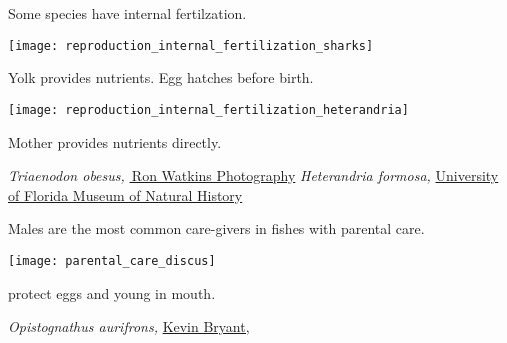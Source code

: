 \label{key}\documentclass[t]{beamer}
\begin{document}
\begin{frame}[t]{Some species have internal fertilzation.}

\vspace*{-\baselineskip}

\begin{multicols}{2}

\texttt{[image: reproduction\_internal\_fertilization\_sharks]}

 Yolk provides nutrients. Egg hatches before birth.

\columnbreak

\texttt{[image: reproduction\_internal\_fertilization\_heterandria]}

 Mother provides nutrients directly.

\end{multicols}

\vfilll

\tiny \textit{Triaenodon obesus, }\href{https://www.ronwatkinsphotography.com/}{\textcopyright\,Ron Watkins Photography} \hfill \textit{Heterandria formosa,} \href{https://www.floridamuseum.ufl.edu/discover-fish/florida-fishes-gallery/least-killifish/}{University of Florida Museum of Natural History}

\end{frame}

%

\begin{frame}[t]{Males are the most common care-givers in fishes with parental care.}

\vspace*{-1.5\baselineskip}

\hfill\texttt{[image: parental\_care\_discus]}


\end{frame}

{
\begin{frame}[t]{ protect eggs and young in mouth.}

\vfilll

\tiny \textit{Opistognathus aurifrons,} \href{https://www.flickr.com/photos/mentalblock/8472805513/in/photostream/}{Kevin Bryant, }
\end{frame}
}
\end{document}

